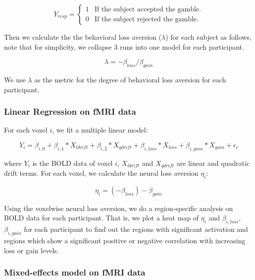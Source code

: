 \begin{displaymath}
Y_{resp} = \left \{ \begin{array}{ll}
1 & \textrm{If the subject accepted the gamble.} \\
0 & \textrm{If the subject rejected the gamble.}
\end{array} \right .
\end{displaymath}

Then we calculate the the behavioral loss aversion ($ \lambda $) for each subject as follows, note that for simplicity, we collapse 3 runs into one model for each participant.

\begin{equation}
\lambda = -\beta_{loss} / \beta_{gain}
\end{equation}

We use $\lambda$ as the metric for the degree of behavioral loss aversion for each participant. 

\subsubsection{Linear Regression on fMRI data}

For each voxel $i$, we fit a multiple linear model:

\begin{equation}
Y_{i} = \beta_{i, 0} + \beta_{i,1} *X_{ldrift} + \beta_{i, 2} * X_{qdrift} + \beta_{i, loss} *X_{loss} + \beta_{i, gain} * X_{gain}  + 
\epsilon_i
\end{equation}

where $Y_{i}$ is the BOLD data of voxel $i$,  $X_{ldrift}$ and $X_{qdrift}$ are linear and quadratic drift terms. For each voxel, we calculate the 
neural loss aversion $\eta_i$:

\begin{equation}
\eta_i = (-\beta_{loss}) - \beta_{gain}
\end{equation}

Using the voxelwise neural loss aversion, we do a region-specific analysis on 
BOLD data for each participant. That is, we plot a heat map of $\eta_i$ and  
$\beta_{i, loss}$, $ \beta_{i, gain}$ for each participant to find out the 
regions with significant activation and regions which show a significant 
positive or negative correlation with increasing loss or gain levels.

\subsubsection{Mixed-effects model on fMRI data}

